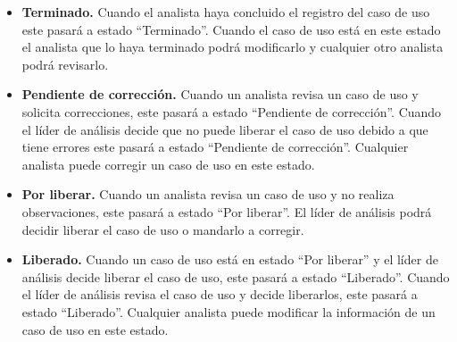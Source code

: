 \begin{itemize}
 \item {\bf Terminado.} Cuando el analista haya concluido el registro del caso de uso este pasará a estado ``Terminado''. Cuando el caso de uso está en este estado
 el analista que lo haya terminado podrá modificarlo y cualquier otro analista podrá revisarlo.
 \item {\bf Pendiente de corrección.} Cuando un analista revisa un caso de uso y solicita correcciones, este pasará a estado ``Pendiente de corrección''. Cuando el 
 líder de análisis decide que no puede liberar el caso de uso debido a que tiene errores este pasará a estado ``Pendiente de corrección''. Cualquier 
 analista puede corregir un caso de uso en este estado.
 \item {\bf Por liberar.} Cuando un analista revisa un caso de uso y no realiza observaciones, este pasará a estado ``Por liberar''. El líder de análisis podrá
 decidir liberar el caso de uso o mandarlo a corregir.
 \item {\bf Liberado.} Cuando un caso de uso está en estado ``Por liberar'' y el líder de análisis decide liberar el caso de uso, este pasará a estado ``Liberado''. 
 Cuando el líder de análisis revisa el caso de uso y decide liberarlos, este pasará a estado ``Liberado''.
 Cualquier analista puede modificar la información de un caso de uso en este estado.
\end{itemize}

